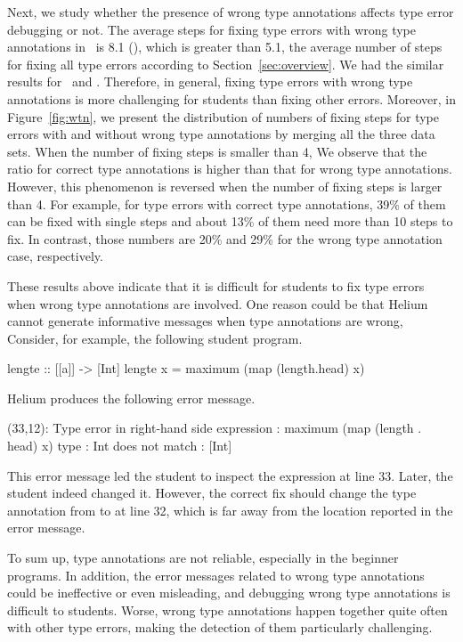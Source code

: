 \documentclass[12pt]{report}	%
\begin{document}
Next, we study whether the presence of wrong type annotations affects
type error debugging or not.
The average steps for fixing type errors with
wrong type annotations in \benchs\
is 8.1 (), which is greater than 5.1,
the average number of steps for fixing
all type errors according to Section~\ref{sec:overview}.
%
We had the similar results for \benchf\ and \benchl.
Therefore, in general, fixing type errors with wrong type annotations
is more challenging for students than fixing other errors.
%
Moreover, in Figure~\ref{fig:wtn}, we present the distribution of 
numbers of fixing
steps for type errors with and without
wrong type annotations by merging
all the three data sets.
When the number of fixing steps is smaller than 4,
We observe that the ratio for correct type annotations
is higher than that for wrong type annotations. 
%
However, this phenomenon is reversed when the number of 
fixing steps is larger than 4. 
%
For example, for type errors with correct type annotations,
39\% of them can be fixed with single steps
and about 13\% of them need more than 10 steps to fix.
In contrast, those numbers are 20\% and 29\% for the wrong
type annotation case, respectively.
%

These results above indicate that it is difficult
for students to fix type errors when
wrong type annotations are involved.
One reason could be that Helium cannot
generate informative messages when type annotations are wrong,
%
Consider, for example, the following student program.
%
\begin{program}
lengte :: [[a]] -> [Int]
lengte x = maximum (map (length.head) x)
\end{program}
%
Helium produces the following error message.
%
\begin{program}
(33,12): Type error in right-hand side
 expression       : maximum (map (length . head) x)
   type           : Int
   does not match : [Int]
\end{program}
%
This error message led the student to inspect
the expression 
at line 33. Later, the student indeed changed it.
However, the correct fix should change the type annotation
from \prog{[[a]]->[Int]} to  at line 32,
which is far away from the location reported in the error message.


To sum up, type annotations are not reliable,
especially in the beginner programs.
In addition, the error messages related to wrong type annotations
could be ineffective or even misleading,
and debugging wrong type annotations is difficult to students.
Worse, wrong type annotations happen together quite often
with other type errors, making the 
detection of them particularly challenging.
\end{document}
